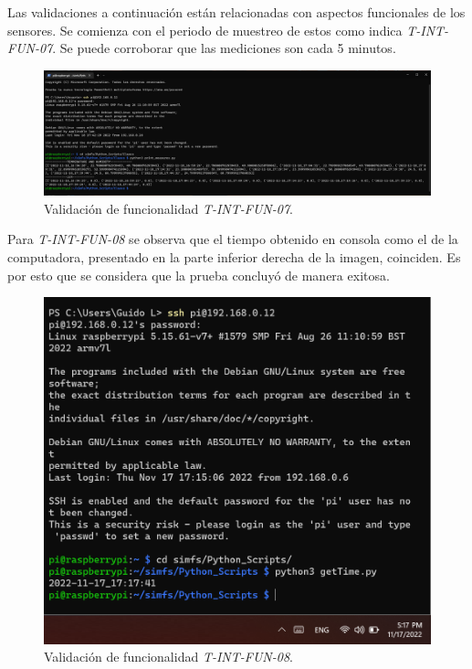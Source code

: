 Las validaciones a continuación están relacionadas con aspectos funcionales de los sensores. Se comienza con el periodo de muestreo de estos como indica \textit{T-INT-FUN-07}. Se puede corroborar que las mediciones son cada 5 minutos.
\begin{figure}[H]
	\centering
    \includegraphics[width=\linewidth]{ImagenesValidacion del prototipo/T-INT-FUN-07}
	\caption{Validación de funcionalidad \textit{T-INT-FUN-07}.}
\end{figure}

Para \textit{T-INT-FUN-08} se observa que el tiempo obtenido en consola como el de la computadora, presentado en la parte inferior derecha de la imagen, coinciden. Es por esto que se considera que la prueba concluyó de manera exitosa.
\begin{figure}[H]
	\centering
    \includegraphics[width=0.8\linewidth]{ImagenesValidacion del prototipo/TINTFUN8}
	\caption{Validación de funcionalidad \textit{T-INT-FUN-08}.}
\end{figure}

